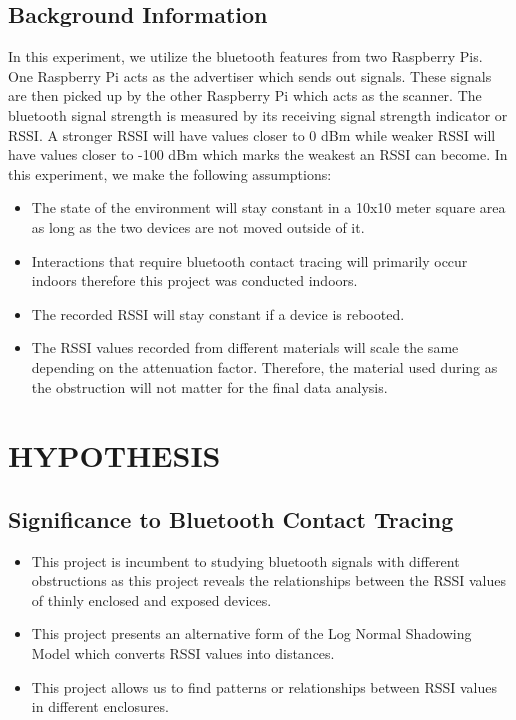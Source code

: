 \documentclass[letterpaper, 10 pt, conference]{ieeeconf}  %
\begin{document}
\subsection{Background Information}
In this experiment, we utilize the bluetooth features from two Raspberry Pis. One Raspberry Pi acts as the advertiser which sends out signals. These signals are then picked up by the other Raspberry Pi which acts as the scanner. The bluetooth signal strength is measured by its receiving signal strength indicator or RSSI. A stronger RSSI will have values closer to 0 dBm while weaker RSSI will have values closer to -100 dBm which marks the weakest an RSSI can become. In this experiment, we make the following assumptions:
\begin{itemize}
\item The state of the environment will stay constant in a 10x10 meter square area as long as the two devices are not moved outside of it.  
\item Interactions that require bluetooth contact tracing will primarily occur indoors therefore this project was conducted indoors.
\item The recorded RSSI will stay constant if a device is rebooted.
\item The RSSI values recorded from different materials will scale the same depending on the attenuation factor. Therefore, the material used during as the obstruction will not matter for the final data analysis.



\end{itemize}
\section{HYPOTHESIS}
\subsection{Significance to Bluetooth Contact Tracing}
\begin{itemize}
\item This project is incumbent to studying bluetooth signals with different obstructions as this project reveals the relationships between the RSSI values of thinly enclosed and exposed devices.
\item This project presents an alternative form of the Log Normal Shadowing Model which converts RSSI values into distances.
\item This project allows us to find patterns or relationships between RSSI values in different enclosures.
\end{itemize}
\end{document}
